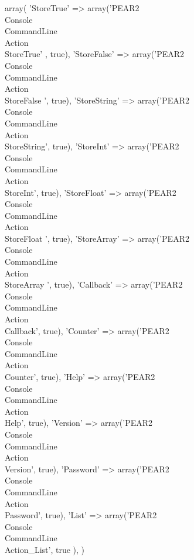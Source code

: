 \begin{DoxyCode}
 array(
        'StoreTrue'   => array('PEAR2\\Console\\CommandLine\\Action\\StoreTrue'
      , true),
        'StoreFalse'  => array('PEAR2\\Console\\CommandLine\\Action\\StoreFalse
      ', true),
        'StoreString' => array('PEAR2\\Console\\CommandLine\\Action\\
      StoreString', true),
        'StoreInt'    => array('PEAR2\\Console\\CommandLine\\Action\\StoreInt',
       true),
        'StoreFloat'  => array('PEAR2\\Console\\CommandLine\\Action\\StoreFloat
      ', true),
        'StoreArray'  => array('PEAR2\\Console\\CommandLine\\Action\\StoreArray
      ', true),
        'Callback'    => array('PEAR2\\Console\\CommandLine\\Action\\Callback',
       true),
        'Counter'     => array('PEAR2\\Console\\CommandLine\\Action\\Counter', 
      true),
        'Help'        => array('PEAR2\\Console\\CommandLine\\Action\\Help', 
      true),
        'Version'     => array('PEAR2\\Console\\CommandLine\\Action\\Version', 
      true),
        'Password'    => array('PEAR2\\Console\\CommandLine\\Action\\Password',
       true),
        'List'        => array('PEAR2\\Console\\CommandLine\\Action_List', true
      ),
    )
\end{DoxyCode}
